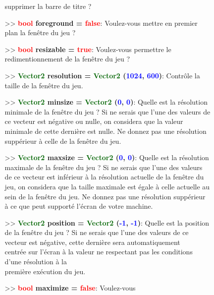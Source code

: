 \documentclass[a4paper, 11pt]{article}
\begin{document}
\begin{description}
\begin{itemize}
\begin{itemize}
				supprimer la barre de titre ?\\
				\item[>> \textbf{\textcolor{red}{bool} foreground = \textcolor{red}{false}}:] Voulez-vous 
				mettre en premier plan la fenêtre du jeu ?\\
				\item[>> \textbf{\textcolor{red}{bool} resizable = \textcolor{red}{true}}:] Voulez-vous 
				permettre le redimentionnement de la fenêtre du jeu ?\\
				\item[>> \textbf{\textcolor{darkgreen}{Vector2} resolution = \textcolor{darkgreen}{Vector2}
				(\textcolor{blue}{1024}, \textcolor{blue}{600})}:] Contrôle la taille de la fenêtre du jeu.
				\\
				\item[>> \textbf{\textcolor{darkgreen}{Vector2} minsize = \textcolor{darkgreen}{Vector2}
				(\textcolor{blue}{0}, \textcolor{blue}{0})}:] Quelle est la résolution minimale de la 
				fenêtre du jeu ? Si ne serais que l'une des valeurs de ce vecteur est négative ou nulle, on 
				considera que la valeur minimale de cette dernière est nulle. Ne donnez pas une résolution 
				suppérieur à celle de la fenêtre du jeu.\\
				\item[>> \textbf{\textcolor{darkgreen}{Vector2} maxsize = \textcolor{darkgreen}{Vector2}
				(\textcolor{blue}{0}, \textcolor{blue}{0})}:] Quelle est la résolution maximale de la 
				fenêtre du jeu ? Si ne serais que l'une des valeurs de ce vecteur est inférieur à la 
				résolution actuelle de la fenêtre du jeu, on considera que la taille maximale est égale à 
				celle actuelle au sein de la fenêtre du jeu. Ne donnez pas une résolution suppérieur à ce
				que peut supporté l'écran de votre machine.\\
				\item[>> \textbf{\textcolor{darkgreen}{Vector2} position = \textcolor{darkgreen}{Vector2}
				(\textcolor{blue}{-1}, \textcolor{blue}{-1})}:] Quelle est la position de la fenêtre du 
				jeu ? Si ne serais que l'une des valeurs de ce vecteur est négative, cette dernière sera 
				automatiquement \\centrée sur l'écran à la valeur ne respectant pas les conditions d'une 
				résolution à la \\première exécution du jeu.\\
				\item[>> \textbf{\textcolor{red}{bool} maximize = \textcolor{red}{false}}:] Voulez-vous 

\end{itemize}
\end{itemize}
\end{description}
\end{document}
